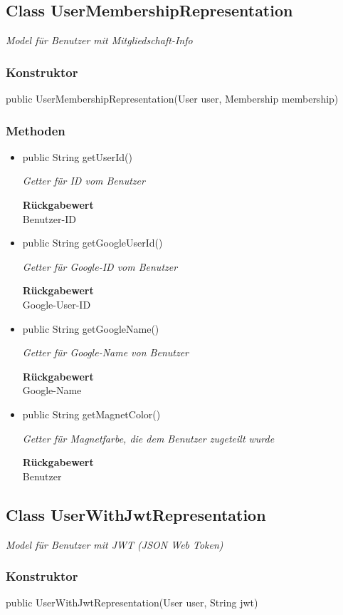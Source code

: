\documentclass[a4paper]{scrreprt}
\begin{document}
    \subsection{Class UserMembershipRepresentation}
    \textit{Model für Benutzer mit Mitgliedschaft-Info}
    \subsubsection{Konstruktor}
    public UserMembershipRepresentation(User user, Membership membership)
    \subsubsection{Methoden}
    \begin{itemize}
    	\item{public String getUserId()}
    	
    	\textit{Getter für ID vom Benutzer}
    	
    	
    	
    	\textbf{Rückgabewert} \\
    	Benutzer-ID        \item{public String getGoogleUserId()}
    	
    	\textit{Getter für Google-ID vom Benutzer}
    	
    	
    	
    	\textbf{Rückgabewert} \\
    	Google-User-ID        \item{public String getGoogleName()}
    	
    	\textit{Getter für Google-Name von Benutzer}
    	
    	
    	
    	\textbf{Rückgabewert} \\
    	Google-Name        \item{public String getMagnetColor()}
    	
    	\textit{Getter für Magnetfarbe, die dem Benutzer zugeteilt wurde}
    	
    	
    	
    	\textbf{Rückgabewert} \\
    	Benutzer
    \end{itemize}
    \subsection{Class UserWithJwtRepresentation}
    \textit{Model für Benutzer mit JWT (JSON Web Token)}
    \subsubsection{Konstruktor}
    public UserWithJwtRepresentation(User user, String jwt)
\end{document}
